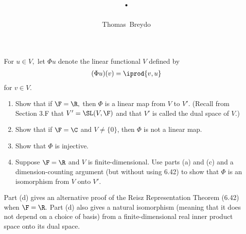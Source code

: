 \documentclass{amsart}
\title{\pagenum.\probnum}
\author{Thomas\ Breydo}
\begin{document}
\maketitle

\begin{problem*}
For $u\in V,$ let $\Phi u$ denote the linear functional $V$ defined
by
\begin{align*}
    (\Phi u)(v)=\iprod{v,u}
\end{align*}
for $v\in V.$

\begin{enumerate}[label=(\alph*),topsep=2ex,itemsep=2ex]
    \item Show that if $\F=\R,$ then $\Phi$ is a linear map from $V$
        to $V'.$ (Recall from Section 3.F that $V'=\SL(V,\F)$
        and that $V'$ is called the dual space of $V.$)

    \item Show that if $\F=\C$ and $V\ne\{0\}$, then $\Phi$ is not
        a linear map.

    \item Show that $\Phi$ is injective.

    \item Suppose $\F=\R$ and $V$ is finite-dimensional. Use parts
        (a) and (c) and a dimension-counting argument (but without
        using 6.42) to show that $\Phi$ is an isomorphism from
        $V$ onto $V'.$
\end{enumerate}
\end{problem*}

\begin{note*}
    Part (d) gives an alternative proof of the Reisz Representation
    Theorem (6.42) when $\F=\R.$ Part (d) also gives a natural
    isomorphism (meaning that it does not depend on a choice of
    basis) from a finite-dimensional real inner product space
    onto its dual space.
\end{note*}

\vspace{0.5in}
\end{document}
